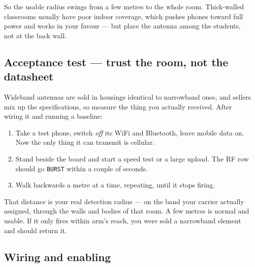 \documentclass[11pt]{article}
\begin{document}
So the usable radius swings from a few metres to the whole room. Thick-walled
classrooms usually have poor indoor coverage, which pushes phones toward full
power and works in your favour --- but place the antenna among the students, not
at the back wall.

\subsection*{Acceptance test --- trust the room, not the datasheet}

Wideband antennas are sold in housings identical to narrowband ones, and sellers
mix up the specifications, so measure the thing you actually received. After
wiring it and running a baseline:

\begin{enumerate}
  \item Take a test phone, switch \emph{off} its WiFi and Bluetooth, leave mobile
        data on. Now the only thing it can transmit is cellular.
  \item Stand beside the board and start a speed test or a large upload. The RF
        row should go \texttt{BURST} within a couple of seconds.
  \item Walk backwards a metre at a time, repeating, until it stops firing.
\end{enumerate}

That distance is your real detection radius --- on the band your carrier actually
assigned, through the walls and bodies of that room. A few metres is normal and
usable. If it only fires within arm's reach, you were sold a narrowband element
and should return it.

\subsection*{Wiring and enabling}
\end{document}
